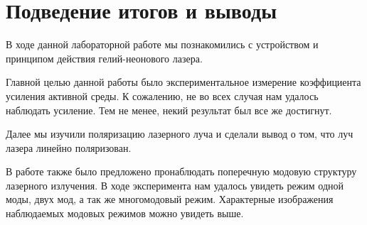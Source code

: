 \documentclass[a4paper,12pt]{article} %
\begin{document}
\newpage

\section{Подведение итогов и выводы}

В ходе данной лабораторной работе мы познакомились с устройством и принципом действия гелий-неонового лазера.

Главной целью данной работы было экспериментальное измерение коэффициента усиления активной среды. К сожалению, не во всех случая нам удалось наблюдать усиление. Тем не менее, некий результат был все же достигнут.

\begin{center}
\end{center}

Далее мы изучили поляризацию лазерного луча и сделали вывод о том, что луч лазера линейно поляризован.

В работе также было предложено пронаблюдать поперечную модовую структуру лазерного излучения. В ходе эксперимента нам удалось увидеть режим одной моды, двух мод, а так же многомодовый режим. Характерные изображения наблюдаемых модовых режимов можно увидеть выше.
\end{document}
